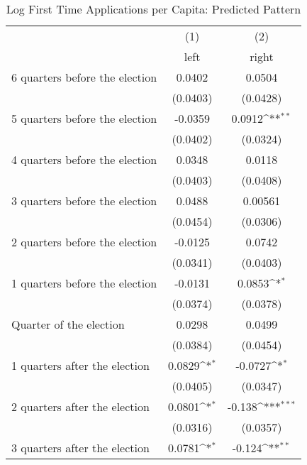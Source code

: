 \begin{table}[htbp]\centering
\def\sym#1{\ifmmode^{#1}\else\(^{#1}\)\fi}
\caption{Log First Time Applications per Capita: Predicted Pattern}
\begin{tabular}{l*{2}{c}}
\hline\hline
                    &\multicolumn{1}{c}{(1)}&\multicolumn{1}{c}{(2)}\\
                    &\multicolumn{1}{c}{left}&\multicolumn{1}{c}{right}\\
\hline
 6 quarters before the election&      0.0402         &      0.0504         \\
                    &    (0.0403)         &    (0.0428)         \\
[1em]
 5 quarters before the election&     -0.0359         &      0.0912\sym{**} \\
                    &    (0.0402)         &    (0.0324)         \\
[1em]
 4 quarters before the election&      0.0348         &      0.0118         \\
                    &    (0.0403)         &    (0.0408)         \\
[1em]
 3 quarters before the election&      0.0488         &     0.00561         \\
                    &    (0.0454)         &    (0.0306)         \\
[1em]
 2 quarters before the election&     -0.0125         &      0.0742         \\
                    &    (0.0341)         &    (0.0403)         \\
[1em]
 1 quarters before the election&     -0.0131         &      0.0853\sym{*}  \\
                    &    (0.0374)         &    (0.0378)         \\
[1em]
Quarter of the election&      0.0298         &      0.0499         \\
                    &    (0.0384)         &    (0.0454)         \\
[1em]
 1 quarters after the election&      0.0829\sym{*}  &     -0.0727\sym{*}  \\
                    &    (0.0405)         &    (0.0347)         \\
[1em]
 2 quarters after the election&      0.0801\sym{*}  &      -0.138\sym{***}\\
                    &    (0.0316)         &    (0.0357)         \\
[1em]
 3 quarters after the election&      0.0781\sym{*}  &      -0.124\sym{**} \\

\end{tabular}
\end{table}
